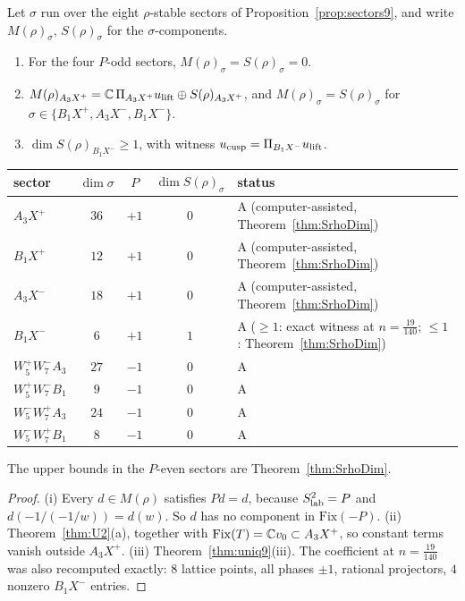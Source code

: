 \begin{proposition}\label{prop:SrhoSectors}
Let $\sigma$ run over the eight $\rho$-stable sectors of Proposition~\ref{prop:sectors9}, and write $M(\rho)_\sigma$, $S(\rho)_\sigma$ for the $\sigma$-components.
\begin{enumerate}[label=(\roman*)]
\item For the four $P$-odd sectors, $M(\rho)_\sigma=S(\rho)_\sigma=0$.
\item $M(\rho)_{A_3X^+}=\mathbb{C}\,\Pi_{A_3X^+}u_{\rm lift}\oplus S(\rho)_{A_3X^+}$, and $M(\rho)_\sigma=S(\rho)_\sigma$ for $\sigma\in\{B_1X^+,A_3X^-,B_1X^-\}$.
\item $\dim S(\rho)_{B_1X^-}\ge1$, with witness $u_{\rm cusp}=\Pi_{B_1X^-}u_{\rm lift}$.
\end{enumerate}
\begin{center}\small
\begin{tabular}{lcccl}\toprule
sector & $\dim\sigma$ & $P$ & $\dim S(\rho)_\sigma$ & status\\\midrule
$A_3X^+$ & $36$ & $+1$ & $0$ & A (computer-assisted, Theorem~\ref{thm:SrhoDim})\\
$B_1X^+$ & $12$ & $+1$ & $0$ & A (computer-assisted, Theorem~\ref{thm:SrhoDim})\\
$A_3X^-$ & $18$ & $+1$ & $0$ & A (computer-assisted, Theorem~\ref{thm:SrhoDim})\\
$B_1X^-$ & $6$ & $+1$ & $1$ & A ($\ge1$: exact witness at $n=\tfrac{19}{140}$; $\le1$: Theorem~\ref{thm:SrhoDim})\\
$W_5^+W_7^-A_3$ & $27$ & $-1$ & $0$ & A\\
$W_5^+W_7^-B_1$ & $9$ & $-1$ & $0$ & A\\
$W_5^-W_7^+A_3$ & $24$ & $-1$ & $0$ & A\\
$W_5^-W_7^+B_1$ & $8$ & $-1$ & $0$ & A\\\bottomrule
\end{tabular}
\end{center}
The upper bounds in the $P$-even sectors are Theorem~\ref{thm:SrhoDim}.
\end{proposition}
\begin{proof}
(i) Every $d\in M(\rho)$ satisfies $Pd=d$, because $S_{\rm lab}^2=P$ and $d(-1/(-1/w))=d(w)$. So $d$ has no component in $\mathrm{Fix}(-P)$.
(ii) Theorem~\ref{thm:U2}(a), together with $\mathrm{Fix}(T)=\mathbb{C} v_0\subset A_3X^+$, so constant terms vanish outside $A_3X^+$.
(iii) Theorem~\ref{thm:uniq9}(iii). The coefficient at $n=\tfrac{19}{140}$ was also recomputed exactly: $8$ lattice points, all phases $\pm1$, rational projectors, $4$ nonzero $B_1X^-$ entries.
\end{proof}
\noindent{}

